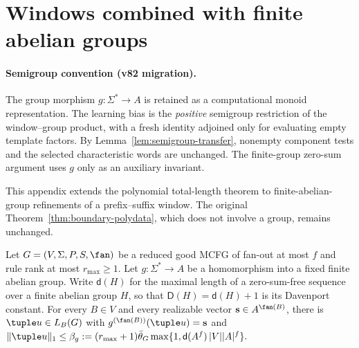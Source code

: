 \section{Windows combined with finite abelian groups}
\label{app:window-abelian}


\paragraph{Semigroup convention (v82 migration).}
The group morphism $g:\Sigma^*\to A$ is retained as a computational
monoid representation. The learning bias is the \emph{positive}
semigroup restriction of the window--group product, with a fresh
identity adjoined only for evaluating empty template factors.
By Lemma~\ref{lem:semigroup-transfer}, nonempty component tests and
the selected characteristic words are unchanged. The finite-group
zero-sum argument uses $g$ only as an auxiliary invariant.


This appendix extends the polynomial total-length theorem to
finite-abelian-group refinements of a prefix--suffix window.
The original Theorem~\ref{thm:boundary-polydata},
which does not involve a group, remains unchanged.

\begin{lemma}
\label{lem:group-typed-shortest}
Let $G=(V,\Sigma,P,S,\fan)$ be a reduced good
MCFG of fan-out at most $f$ and rule rank at most
$r_{\max}\ge1$. Let
$g:\Sigma^*\to A$ be a homomorphism into a fixed
finite abelian group. Write $\mathsf d(H)$ for the
maximal length of a zero-sum-free sequence over a
finite abelian group $H$, so that $\mathsf D(H)=\mathsf d(H)+1$
is its Davenport constant.
For every $B\in V$ and
every realizable vector
$\mathbf s\in A^{\fan(B)}$, there is
$\tuple u\in L_B(G)$ with
$g^{(\fan(B))}(\tuple u)=\mathbf s$
and
\(\|\tuple u\|_1\le\beta_g:= (r_{\max}+1)\bar\theta_G \max\{1,\mathsf d(A^f)\,|V||A|^f\}.\)
\end{lemma}

